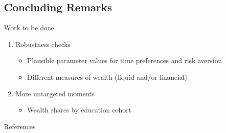 \documentclass{beamer}
\begin{document}
\subsection{Concluding Remarks}

\begin{frame}{Work to be done}

       \begin{enumerate}
       \item Robustness checks
       \begin{itemize}
      \item Plausible parameter values for time preferences and risk aversion
      \item Different measures of wealth (liquid and/or financial)
      \end{itemize}
    \item More untargeted moments
      \begin{itemize}
        \item Wealth shares by education cohort
        \end{itemize}
    \end{enumerate}

\end{frame}

%




\begin{frame}[allowframebreaks]{References}
  \printbibliography
\end{frame}
\end{document}

